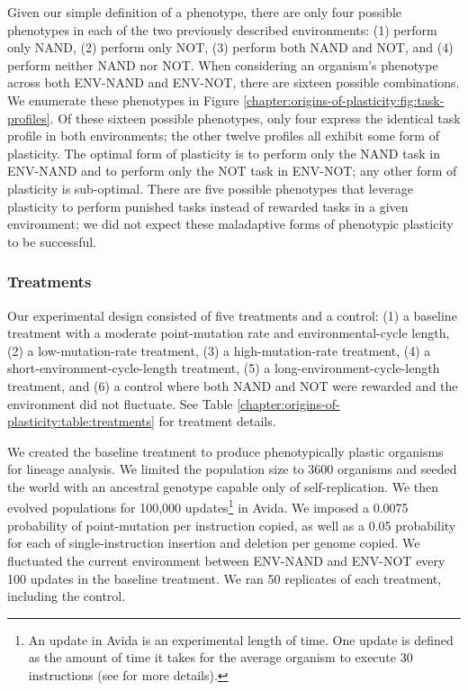 Given our simple definition of a phenotype, there are only four possible phenotypes in each of the two previously described environments: 
(1) perform only NAND, 
(2) perform only NOT, 
(3) perform both NAND and NOT, 
and (4) perform neither NAND nor NOT. 
When considering an organism's phenotype across both ENV-NAND and ENV-NOT, there are sixteen possible combinations. 
We enumerate these phenotypes in Figure \ref{chapter:origins-of-plasticity:fig:task-profiles}. 
Of these sixteen possible phenotypes, only four express the identical task profile in both environments; the other twelve profiles all exhibit some form of plasticity. 
The optimal form of plasticity is to perform only the NAND task in ENV-NAND and to perform only the NOT task in ENV-NOT; any other form of plasticity is sub-optimal. 
There are five possible phenotypes that leverage plasticity to perform punished tasks instead of rewarded tasks in a given environment; we did not expect these maladaptive forms of phenotypic plasticity to be successful. 



\subsubsection{Treatments}
\label{chapter:origins-of-plasticity:sec:methods:experimental-design:treatments}

Our experimental design consisted of five treatments and a control: 
(1) a baseline treatment with a moderate point-mutation rate and environmental-cycle length, 
(2) a low-mutation-rate treatment, 
(3) a high-mutation-rate treatment, 
(4) a short-environment-cycle-length treatment, 
(5) a long-environment-cycle-length treatment, 
and (6) a control where both NAND and NOT were rewarded and the environment did not fluctuate. 
See Table \ref{chapter:origins-of-plasticity:table:treatments} for treatment details.

We created the baseline treatment to produce phenotypically plastic organisms for lineage analysis. 
We limited the population size to 3600 organisms and seeded the world with an ancestral genotype capable only of self-replication.
We then evolved populations for 100,000 updates\footnote{
An update in Avida is an experimental length of time. One update is defined as the amount of time it takes for the average organism to execute 30 instructions (see \citep{ofria_avida:_2009} for more details).
} in Avida. 
We imposed a 0.0075 probability of point-mutation per instruction copied, as well as a 0.05 probability for each of single-instruction insertion and deletion per genome copied. 
We fluctuated the current environment between ENV-NAND and ENV-NOT every 100 updates in the baseline treatment. 
We ran 50 replicates of each treatment, including the control. 

